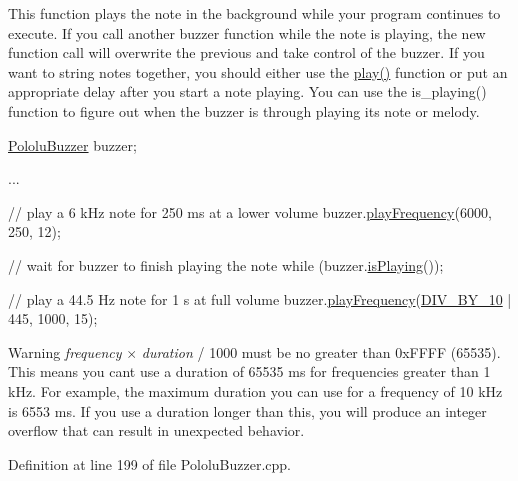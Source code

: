 This function plays the note in the background while your program continues to execute. If you call another buzzer function while the note is playing, the new function call will overwrite the previous and take control of the buzzer. If you want to string notes together, you should either use the {\ttfamily \hyperlink{class_pololu_buzzer_a22f45ef7cdf9dc8fc54e617244368277}{play()}} function or put an appropriate delay after you start a note playing. You can use the {\ttfamily is\+\_\+playing()} function to figure out when the buzzer is through playing its note or melody.


\begin{DoxyCode}
\hyperlink{class_pololu_buzzer}{PololuBuzzer} buzzer;

...

\textcolor{comment}{// play a 6 kHz note for 250 ms at a lower volume}
buzzer.\hyperlink{class_pololu_buzzer_a931fafd76045ae59d4ba62c9bf90b0dc}{playFrequency}(6000, 250, 12);

\textcolor{comment}{// wait for buzzer to finish playing the note}
\textcolor{keywordflow}{while} (buzzer.\hyperlink{class_pololu_buzzer_a8045fdf0a144e0b71a5b223a0ef34027}{isPlaying}());

\textcolor{comment}{// play a 44.5 Hz note for 1 s at full volume}
buzzer.\hyperlink{class_pololu_buzzer_a931fafd76045ae59d4ba62c9bf90b0dc}{playFrequency}(\hyperlink{_pololu_buzzer_8h_a8548d3f2b6d5fa2bcc350fad4a2c72a8}{DIV\_BY\_10} | 445, 1000, 15);
\end{DoxyCode}


\begin{DoxyWarning}{Warning}
{\itshape frequency} {$\times$} {\itshape duration} / 1000 must be no greater than 0x\+F\+F\+FF (65535). This means you can\textquotesingle{}t use a duration of 65535 ms for frequencies greater than 1 k\+Hz. For example, the maximum duration you can use for a frequency of 10 k\+Hz is 6553 ms. If you use a duration longer than this, you will produce an integer overflow that can result in unexpected behavior. 
\end{DoxyWarning}


Definition at line 199 of file Pololu\+Buzzer.\+cpp.

\mbox{\label{class_pololu_buzzer_a07ff4e9d9f7e4f37a58e149640b61f4e}} 
